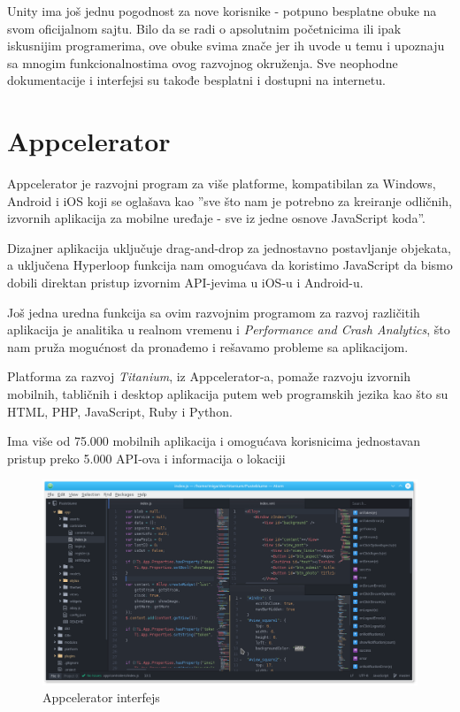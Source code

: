 \documentclass[12pt]{article}
\begin{document}
Unity ima još jednu pogodnost za nove korisnike - potpuno besplatne obuke na svom oficijalnom sajtu.
Bilo da se radi o apsolutnim početnicima ili ipak iskusnijim programerima, ove obuke svima znače jer ih uvode u temu i upoznaju sa mnogim funkcionalnostima ovog razvojnog okruženja.
Sve neophodne dokumentacije i interfejsi su takođe besplatni i dostupni na internetu.

\section{Appcelerator}
Appcelerator je razvojni program za više platforme, kompatibilan za Windows, Android i iOS koji se oglašava kao  ''sve što nam je potrebno za kreiranje odličnih, izvornih aplikacija za mobilne uređaje - sve iz jedne osnove JavaScript koda''.

Dizajner aplikacija uključuje drag-and-drop za jednostavno postavljanje objekata, a uključena Hyperloop funkcija nam omogućava da koristimo JavaScript da bismo dobili direktan pristup izvornim API-jevima u iOS-u i Android-u.

Još jedna uredna funkcija sa ovim razvojnim programom za razvoj različitih aplikacija je analitika u realnom vremenu i \textit{Performance and Crash Analytics}, što nam pruža mogućnost da pronađemo i rešavamo probleme sa aplikacijom.

Platforma za razvoj \textit{Titanium}, iz Appcelerator-a, pomaže razvoju izvornih mobilnih, tabličnih i desktop aplikacija putem web programskih jezika kao što su HTML, PHP, JavaScript, Ruby i Python.

Ima više od 75.000 mobilnih aplikacija i omogućava korisnicima jednostavan pristup preko 5.000 API-ova i informacija o lokaciji

\begin{figure}[ht!]
    \centering
    \includegraphics[scale=0.3]{Appcelerator.png}
    \caption{Appcelerator interfejs}
\end{figure}
\end{document}

